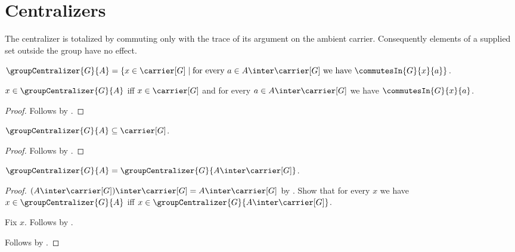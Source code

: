 

\section{Centralizers}

The centralizer is totalized by commuting only with the trace of its argument
on the ambient carrier.  Consequently elements of a supplied set outside the
group have no effect.

\begin{definition}\label{group_centralizer}
    $\groupCentralizer{G}{A}=
        \{x\in\carrier[G]\mid
            \text{for every $a\in A\inter\carrier[G]$ we have
                $\commutesIn{G}{x}{a}$}\}$.
\end{definition}

\begin{proposition}\label{group_centralizer_iff}
    $x\in\groupCentralizer{G}{A}$ iff
        $x\in\carrier[G]$ and
        for every $a\in A\inter\carrier[G]$ we have
            $\commutesIn{G}{x}{a}$.
\end{proposition}
\begin{proof}
    Follows by .
\end{proof}

\begin{proposition}\label{group_centralizer_subseteq}
    $\groupCentralizer{G}{A}\subseteq\carrier[G]$.
\end{proposition}
\begin{proof}
    Follows by .
\end{proof}

\begin{proposition}\label{group_centralizer_trace}
    $\groupCentralizer{G}{A}=
        \groupCentralizer{G}{A\inter\carrier[G]}$.
\end{proposition}
\begin{proof}
    $(A\inter\carrier[G])\inter\carrier[G]
        =A\inter\carrier[G]$ by
        .
    Show that for every $x$ we have
        $x\in\groupCentralizer{G}{A}$ iff
        $x\in\groupCentralizer{G}{A\inter\carrier[G]}$.
    \begin{subproof}
        Fix $x$.
        Follows by .
    \end{subproof}
    Follows by .
\end{proof}

